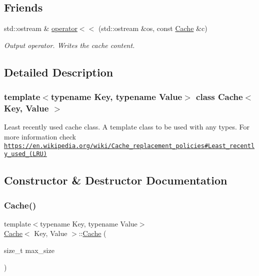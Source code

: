 \subsection*{Friends}
\begin{DoxyCompactItemize}
\item 
\mbox{\label{classCache_a11049cc49065d8bad3f6154e155922f1}} 
std\+::ostream \& \hyperlink{classCache_a11049cc49065d8bad3f6154e155922f1}{operator$<$$<$} (std\+::ostream \&os, const \hyperlink{classCache}{Cache} \&c)
\begin{DoxyCompactList}\small\item\em Output operator. Writes the cache content. \end{DoxyCompactList}\end{DoxyCompactItemize}


\subsection{Detailed Description}
\subsubsection*{template$<$typename Key, typename Value$>$\newline
class Cache$<$ Key, Value $>$}

Least recently used cache class. A template class to be used with any types. For more information check \href{https://en.wikipedia.org/wiki/Cache_replacement_policies#Least_recently_used_(LRU)}{\tt https\+://en.\+wikipedia.\+org/wiki/\+Cache\+\_\+replacement\+\_\+policies\#\+Least\+\_\+recently\+\_\+used\+\_\+(\+L\+R\+U)} 

\subsection{Constructor \& Destructor Documentation}
\mbox{\label{classCache_aff01185fbb5b12ac5e139444e092b471}} 
\subsubsection{\texorpdfstring{Cache()}{Cache()}}
{\footnotesize\ttfamily template$<$typename Key, typename Value$>$ \\
\hyperlink{classCache}{Cache}$<$ Key, Value $>$\+::\hyperlink{classCache}{Cache} (\begin{DoxyParamCaption}\item[{size\+\_\+t}]{max\+\_\+size }\end{DoxyParamCaption})\hspace{0.3cm}{\ttfamily [inline]}}



